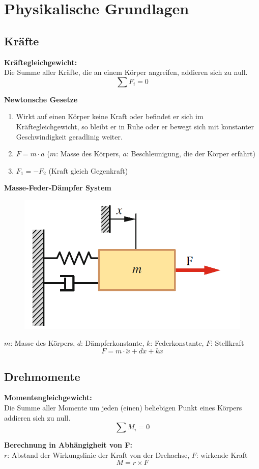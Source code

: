 \documentclass[10pt,a4paper]{article}
\newcommand{\tab}[1][1]{\hspace*{#1cm}}
\begin{document}
\section{Physikalische Grundlagen}
\subsection{Kräfte}
\textbf{Kräftegleichgewicht:} \\
Die Summe aller Kräfte, die an einem Körper angreifen, addieren sich zu null.
$$
	\sum F_i = 0
$$

\textbf{Newtonsche Gesetze}
\begin{enumerate}
	\item Wirkt auf einen Körper keine Kraft oder befindet er sich im Kräftegleichgewicht, so bleibt er in Ruhe oder er bewegt sich mit konstanter Geschwindigkeit geradlinig weiter.
	\item $F = m ⋅ a$ \tab[2] ($m$: Masse des Körpers, $a$: Beschleunigung, die der Körper erfährt)
	\item $F_1 = -F_2$ \tab[2] (Kraft gleich Gegenkraft)
\end{enumerate}

\textbf{Masse-Feder-Dämpfer System}
\begin{figure}[H]
	\includegraphics[width=0.5\columnwidth]{imgs/mass-spring-damper.png}
\end{figure}
$m$: Masse des Körpers, $d$: Dämpferkonstante, $k$: Federkonstante, $F$: Stellkraft
$$
	F = m ⋅ \ddot x + d \dot x + k x
$$


\subsection{Drehmomente}
\textbf{Momentengleichgewicht:} \\
Die Summe aller Momente um jeden (einen) beliebigen Punkt eines Körpers addieren sich zu null.
$$
	\sum M_i = 0
$$

\textbf{Berechnung in Abhängigheit von F:} \\
$r$: Abstand der Wirkungslinie der Kraft von der Drehachse, $F$: wirkende Kraft
$$
	M = r \times F
$$
\end{document}
